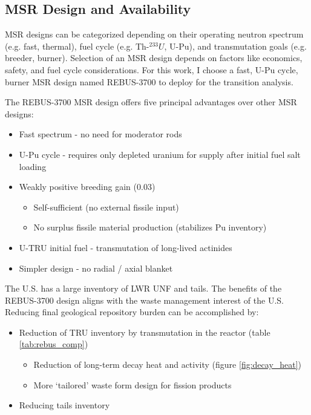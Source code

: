 \subsection{\gls{MSR} Design and Availability}

\gls{MSR} designs can be categorized depending on their operating
neutron spectrum (e.g. fast, thermal), fuel cycle (e.g. Th-$^{233}U$, U-Pu),
and transmutation goals (e.g. breeder, burner). Selection of an \gls{MSR}
design depends on factors like economics, safety, and fuel cycle
considerations. For this work, I choose a fast, U-Pu cycle, burner \gls{MSR} design
named REBUS-3700 \cite{mourogov_potentialities_2006} to deploy for the
transition analysis.

The REBUS-3700 \gls{MSR} design offers five principal
advantages over other \gls{MSR} designs:
\begin{itemize}
	\item Fast spectrum - no need for moderator rods
	\item U-Pu cycle - requires only depleted uranium for supply after initial fuel salt loading
	\item Weakly positive breeding gain (0.03)
	\begin{itemize}
		\item Self-sufficient (no external fissile input)
		\item No surplus fissile material production (stabilizes Pu inventory)
	\end{itemize}
	\item U-\gls{TRU} initial fuel - transmutation of long-lived actinides
	\item Simpler design - no radial / axial blanket
\end{itemize}

The U.S. has a large inventory of \gls{LWR} \gls{UNF} and tails. The benefits
of the REBUS-3700 design aligns with the waste management interest
of the U.S. Reducing final geological repository burden can be
accomplished by:

\begin{itemize}
	\item Reduction of \gls{TRU} inventory by transmutation in the reactor (table \ref{tab:rebus_comp})
	\begin{itemize}
		\item Reduction of long-term decay heat and activity (figure \ref{fig:decay_heat})
		\item More `tailored' waste form design for fission products
	\end{itemize}
	\item Reducing tails inventory
\end{itemize}

